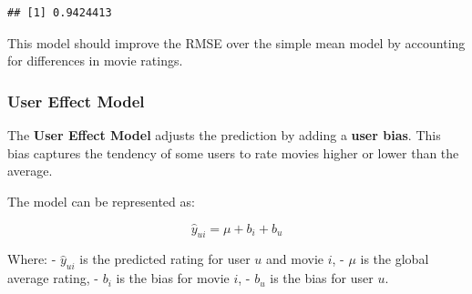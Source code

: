 \documentclass[
]{article}
\newenvironment{Shaded}{}{}
\newcommand{\AttributeTok}[1]{\textcolor[rgb]{0.49,0.56,0.16}{#1}}
\newcommand{\CommentTok}[1]{\textcolor[rgb]{0.38,0.63,0.69}{\textit{#1}}}
\newcommand{\FunctionTok}[1]{\textcolor[rgb]{0.02,0.16,0.49}{#1}}
\newcommand{\NormalTok}[1]{#1}
\newcommand{\OtherTok}[1]{\textcolor[rgb]{0.00,0.44,0.13}{#1}}
\newcommand{\SpecialCharTok}[1]{\textcolor[rgb]{0.25,0.44,0.63}{#1}}
\newcommand{\StringTok}[1]{\textcolor[rgb]{0.25,0.44,0.63}{#1}}
\begin{document}
\begin{verbatim}
## [1] 0.9424413
\end{verbatim}

This model should improve the RMSE over the simple mean model by
accounting for differences in movie ratings.

\subsubsection{User Effect Model}\label{user-effect-model}

The \textbf{User Effect Model} adjusts the prediction by adding a
\textbf{user bias}. This bias captures the tendency of some users to
rate movies higher or lower than the average.

The model can be represented as:

\[
\hat{y}_{ui} = \mu + b_i + b_u
\]

Where: - \(\hat{y}_{ui}\) is the predicted rating for user \(u\) and
movie \(i\), - \(\mu\) is the global average rating, - \(b_i\) is the
bias for movie \(i\), - \(b_u\) is the bias for user \(u\).

\begin{Shaded}
\end{Shaded}
\end{document}
